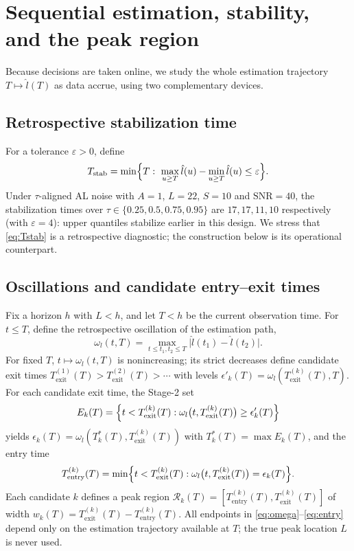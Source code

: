 \documentclass[11pt,a4paper]{article}
\begin{document}
\section{Sequential estimation, stability, and the peak region}
\label{sec:stability}

Because decisions are taken online, we study the whole estimation trajectory
$T\mapsto\hat l(T)$ as data accrue, using two complementary devices.

\subsection{Retrospective stabilization time}

For a tolerance $\varepsilon>0$, define
\begin{equation}
T_{\mathrm{stab}}
=\min\Bigl\{T:\ \max_{u\ge T}\hat l(u)-\min_{u\ge T}\hat l(u)\le\varepsilon\Bigr\}.
\label{eq:Tstab}
\end{equation}
Under $\tau$-aligned AL noise with $A=1$, $L=22$, $S=10$ and
$\mathrm{SNR}=40$, the stabilization times over
$\tau\in\{0.25,0.5,0.75,0.95\}$ are $17,17,11,10$ respectively (with
$\varepsilon=4$): upper quantiles stabilize earlier in this design. We stress
that \eqref{eq:Tstab} is a retrospective diagnostic; the construction below is
its operational counterpart.

\subsection{Oscillations and candidate entry--exit times}

Fix a horizon $h$ with $L<h$, and let $T<h$ be the current observation time.
For $t\le T$, define the retrospective oscillation of the estimation path,
\begin{equation}
\omega_l(t,T)=\max_{t\le t_1,t_2\le T}\bigl|\hat l(t_1)-\hat l(t_2)\bigr|.
\label{eq:omega}
\end{equation}
For fixed $T$, $t\mapsto\omega_l(t,T)$ is nonincreasing; its strict decreases
define candidate exit times
$T_{\mathrm{exit}}^{(1)}(T)>T_{\mathrm{exit}}^{(2)}(T)>\cdots$ with levels
$\epsilon'_k(T)=\omega_l(T_{\mathrm{exit}}^{(k)}(T),T)$. For each candidate
exit time, the Stage-2 set
\begin{equation}
E_k(T)=\Bigl\{t<T_{\mathrm{exit}}^{(k)}(T):
\omega_l\bigl(t,T_{\mathrm{exit}}^{(k)}(T)\bigr)\ge\epsilon'_k(T)\Bigr\}
\label{eq:stage2}
\end{equation}
yields $\epsilon_k(T)=\omega_l(T_k^*(T),T_{\mathrm{exit}}^{(k)}(T))$ with
$T_k^*(T)=\max E_k(T)$, and the entry time
\begin{equation}
T_{\mathrm{entry}}^{(k)}(T)
=\min\Bigl\{t<T_{\mathrm{exit}}^{(k)}(T):
\omega_l\bigl(t,T_{\mathrm{exit}}^{(k)}(T)\bigr)=\epsilon_k(T)\Bigr\}.
\label{eq:entry}
\end{equation}
Each candidate $k$ defines a peak region
$\mathcal R_k(T)=[T_{\mathrm{entry}}^{(k)}(T),T_{\mathrm{exit}}^{(k)}(T)]$ of
width $w_k(T)=T_{\mathrm{exit}}^{(k)}(T)-T_{\mathrm{entry}}^{(k)}(T)$. All
endpoints in \eqref{eq:omega}--\eqref{eq:entry} depend only on the estimation
trajectory available at $T$; the true peak location $L$ is never used.
\end{document}
